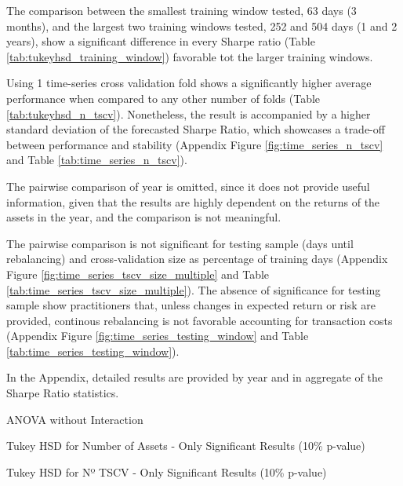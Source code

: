 \documentclass{article}
\begin{document}
The comparison between the smallest training window tested, 63 days (3 months), and the largest two training windows tested, 252 and 504 days (1 and 2 years), show a significant difference in every Sharpe ratio (Table \ref{tab:tukeyhsd_training_window}) favorable tot the larger training windows.

Using 1 time-series cross validation fold shows a significantly higher average performance when compared to any other number of folds (Table \ref{tab:tukeyhsd_n_tscv}). Nonetheless, the result is accompanied by a higher standard deviation of the forecasted Sharpe Ratio, which showcases a trade-off between performance and stability (Appendix Figure \ref{fig:time_series_n_tscv} and Table \ref{tab:time_series_n_tscv}).

The pairwise comparison of year is omitted, since it does not provide useful information, given that the results are highly dependent on the returns of the assets in the year, and the comparison is not meaningful.

The pairwise comparison is not significant for testing sample (days until rebalancing) and cross-validation size as percentage of training days (Appendix Figure \ref{fig:time_series_tscv_size_multiple} and Table \ref{tab:time_series_tscv_size_multiple}). The absence of significance for testing sample show practitioners that, unless changes in expected return or risk are provided, continous rebalancing is not favorable accounting for transaction costs (Appendix Figure \ref{fig:time_series_testing_window} and Table \ref{tab:time_series_testing_window}).

In the Appendix, detailed results are provided by year and in aggregate of the Sharpe Ratio statistics.

\begin{table}[h]
    \label{tab:anova_multi_factor}
    \centering
    {\scriptsize
        
    }
    \caption{ANOVA without Interaction}
\end{table}

\begin{table}[h]
    \label{tab:tukeyhsd_n_assets}
    \centering
    {\scriptsize
        
    }
    \caption{Tukey HSD for Number of Assets - Only Significant Results (10\% p-value)}
\end{table}

\begin{table}[h]
    \label{tab:tukeyhsd_n_tscv}
    \centering
    {\scriptsize
        
    }
    \caption{Tukey HSD for Nº TSCV - Only Significant Results (10\% p-value)}
\end{table}
\end{document}
